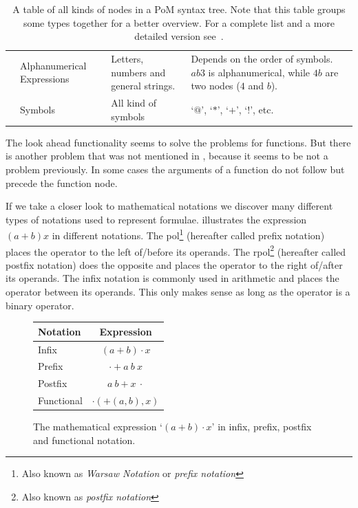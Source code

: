\documentclass[a4paper,11pt]{article}
\theoremstyle{defTheoStyle}
\theoremstyle{defExampStyle}
\begin{document}
\begin{table}[t!]
\begin{tabularx}{\textwidth}{Y{1.55cm} Y{2.5cm} L L}
	 & Alphanumerical Expressions & Letters, numbers and general strings. & Depends on the order of symbols. $ab3$ is alphanumerical, while $4b$ are two nodes ($4$ and $b$).\\
	 & Symbols & All kind of symbols & `$@$', `$*$', `$+$', `$!$', etc.\\
	\hline
\end{tabularx}
\caption{A table of all kinds of nodes in a PoM syntax tree. Note that this table groups some types together for a better overview. For a complete list and a more detailed version see~\parencite{POM-Tagger}.}
\label{tab:allTypesTable}
\end{table} 

The look ahead functionality seems to solve the problems for functions. But there is another problem that was not mentioned in , because it seems to be not a problem previously. In some cases the arguments of a function do not follow but precede the function node. 

If we take a closer look to mathematical notations we discover many different types of notations used to represent formulae.  illustrates the expression $(a+b)x$ in different notations. The \gls*{pol}\footnote{Also known as \textit{Warsaw Notation} or \textit{prefix notation}} (hereafter called prefix notation) places the operator to the left of/before its operands. The \gls*{rpol}\footnote{Also known as \textit{postfix notation}} (hereafter called postfix notation) does the opposite and places the operator to the right of/after its operands. The infix notation is commonly used in arithmetic and places the operator between its operands. This only makes sense as long as the operator is a binary operator.

\begin{figure} %
\vspace{-8pt}
\begin{minipage}{0.38\textwidth}
\center
\begin{tabular}{lc}
	\hline
	Notation & Expression \\
	\hline
	Infix & $(a+b) \cdot x$\\
	Prefix & $\cdot + a\ b\ x$\\
	Postfix & $a\ b + x\ \cdot$\\
	Functional & $\cdot(+(a, b), x)$\\
	\hline
\end{tabular}
\caption{The mathematical expression `$(a+b) \cdot x$' in infix, prefix, postfix and functional notation.}
\label{tab:notations}
\end{minipage}
\end{figure}
\end{document}
